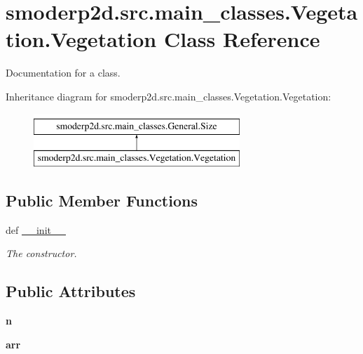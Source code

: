 \hypertarget{classsmoderp2d_1_1src_1_1main__classes_1_1Vegetation_1_1Vegetation}{\section{smoderp2d.\-src.\-main\-\_\-classes.\-Vegetation.\-Vegetation Class Reference}
\label{classsmoderp2d_1_1src_1_1main__classes_1_1Vegetation_1_1Vegetation}
}


Documentation for a class.  


Inheritance diagram for smoderp2d.\-src.\-main\-\_\-classes.\-Vegetation.\-Vegetation\-:\begin{figure}[H]
\begin{center}
\leavevmode
\includegraphics[height=2.000000cm]{classsmoderp2d_1_1src_1_1main__classes_1_1Vegetation_1_1Vegetation}
\end{center}
\end{figure}
\subsection*{Public Member Functions}
\begin{DoxyCompactItemize}
\item 
def \hyperlink{classsmoderp2d_1_1src_1_1main__classes_1_1Vegetation_1_1Vegetation_a43109cd6b3a251504b55454a9a838ec3}{\-\_\-\-\_\-init\-\_\-\-\_\-}
\begin{DoxyCompactList}\small\item\em The constructor. \end{DoxyCompactList}\end{DoxyCompactItemize}
\subsection*{Public Attributes}
\begin{DoxyCompactItemize}
\item 
\hypertarget{classsmoderp2d_1_1src_1_1main__classes_1_1Vegetation_1_1Vegetation_a9593101bb8240bc05a0f96b25a584c61}{{\bfseries n}}\label{classsmoderp2d_1_1src_1_1main__classes_1_1Vegetation_1_1Vegetation_a9593101bb8240bc05a0f96b25a584c61}

\item 
\hypertarget{classsmoderp2d_1_1src_1_1main__classes_1_1Vegetation_1_1Vegetation_a507eb051e0057baa26987568f2cae514}{{\bfseries arr}}\label{classsmoderp2d_1_1src_1_1main__classes_1_1Vegetation_1_1Vegetation_a507eb051e0057baa26987568f2cae514}

\end{DoxyCompactItemize}


